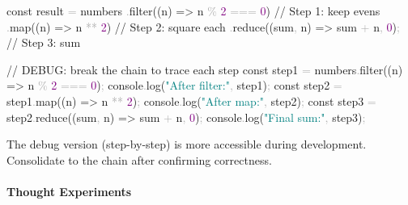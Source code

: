\documentclass[
  justified,
  openright,
]{tufte-book}
\let\paragraph\paragraph
\newcommand{\BuiltInTok}[1]{#1}
\newcommand{\CommentTok}[1]{\textcolor{MidGray}{#1}}
\newcommand{\DecValTok}[1]{\textcolor{Purple}{#1}}
\newcommand{\FunctionTok}[1]{\textcolor{BrandBlue}{#1}}
\newcommand{\KeywordTok}[1]{\textcolor{BrandBlue}{#1}}
\newcommand{\NormalTok}[1]{#1}
\newcommand{\OperatorTok}[1]{\textcolor{DarkGray}{#1}}
\newcommand{\StringTok}[1]{\textcolor{Teal}{#1}}
\newenvironment{Shaded}{%
  \begin{snugshade}
}{%
  \end{snugshade}
}
\let\paragraph\paragraph
\begin{document}
\begin{Shaded}
\begin{Highlighting}[]
\KeywordTok{const}\NormalTok{ result }\OperatorTok{=}\NormalTok{ numbers}
  \OperatorTok{.}\FunctionTok{filter}\NormalTok{((n) }\KeywordTok{=\textgreater{}}\NormalTok{ n }\OperatorTok{\%} \DecValTok{2} \OperatorTok{===} \DecValTok{0}\NormalTok{) }\CommentTok{// Step 1: keep evens}
  \OperatorTok{.}\FunctionTok{map}\NormalTok{((n) }\KeywordTok{=\textgreater{}}\NormalTok{ n }\OperatorTok{**} \DecValTok{2}\NormalTok{) }\CommentTok{// Step 2: square each}
  \OperatorTok{.}\FunctionTok{reduce}\NormalTok{((sum}\OperatorTok{,}\NormalTok{ n) }\KeywordTok{=\textgreater{}}\NormalTok{ sum }\OperatorTok{+}\NormalTok{ n}\OperatorTok{,} \DecValTok{0}\NormalTok{)}\OperatorTok{;} \CommentTok{// Step 3: sum}

\CommentTok{// DEBUG: break the chain to trace each step}
\KeywordTok{const}\NormalTok{ step1 }\OperatorTok{=}\NormalTok{ numbers}\OperatorTok{.}\FunctionTok{filter}\NormalTok{((n) }\KeywordTok{=\textgreater{}}\NormalTok{ n }\OperatorTok{\%} \DecValTok{2} \OperatorTok{===} \DecValTok{0}\NormalTok{)}\OperatorTok{;}
\BuiltInTok{console}\OperatorTok{.}\FunctionTok{log}\NormalTok{(}\StringTok{"After filter:"}\OperatorTok{,}\NormalTok{ step1)}\OperatorTok{;}
\KeywordTok{const}\NormalTok{ step2 }\OperatorTok{=}\NormalTok{ step1}\OperatorTok{.}\FunctionTok{map}\NormalTok{((n) }\KeywordTok{=\textgreater{}}\NormalTok{ n }\OperatorTok{**} \DecValTok{2}\NormalTok{)}\OperatorTok{;}
\BuiltInTok{console}\OperatorTok{.}\FunctionTok{log}\NormalTok{(}\StringTok{"After map:"}\OperatorTok{,}\NormalTok{ step2)}\OperatorTok{;}
\KeywordTok{const}\NormalTok{ step3 }\OperatorTok{=}\NormalTok{ step2}\OperatorTok{.}\FunctionTok{reduce}\NormalTok{((sum}\OperatorTok{,}\NormalTok{ n) }\KeywordTok{=\textgreater{}}\NormalTok{ sum }\OperatorTok{+}\NormalTok{ n}\OperatorTok{,} \DecValTok{0}\NormalTok{)}\OperatorTok{;}
\BuiltInTok{console}\OperatorTok{.}\FunctionTok{log}\NormalTok{(}\StringTok{"Final sum:"}\OperatorTok{,}\NormalTok{ step3)}\OperatorTok{;}
\end{Highlighting}
\end{Shaded}

The debug version (step-by-step) is more accessible during development.
Consolidate to the chain after confirming correctness.

\paragraph{Thought Experiments}\label{thought-experiments-4}
\end{document}
